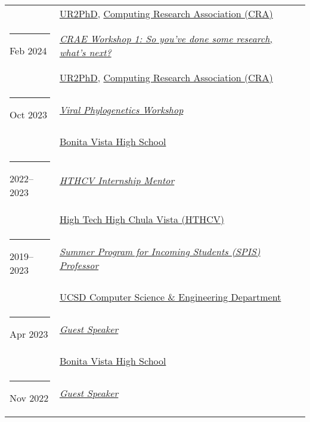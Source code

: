 \documentclass[margin,line]{res}
\begin{document}
\begin{resume}
\begin{longtable}{@{}p{0.7in}p{4in}}
\hspace*{-4mm} & \hspace{4mm} \href{https://cra.org/ur2phd}{UR2PhD}, \href{https://cra.org/}{Computing Research Association (CRA)}\\
\hspace*{-4mm} \rule{-1mm}{5mm} Feb 2024 & \href{https://cra.org/ur2phd/#undergraduate-students}{\textit{CRAE Workshop 1: So you've done some research, what's next?}}\\*
\hspace*{-4mm} & \hspace{4mm} \href{https://cra.org/ur2phd}{UR2PhD}, \href{https://cra.org/}{Computing Research Association (CRA)}\\
\hspace*{-4mm} \rule{-1mm}{5mm} Oct 2023 & \href{https://bvh.sweetwaterschools.org/}{\textit{Viral Phylogenetics Workshop}}\\*
\hspace*{-4mm} & \hspace{4mm} \href{https://bvh.sweetwaterschools.org/}{Bonita Vista High School}\\
\hspace*{-4mm} \rule{-1mm}{5mm} 2022--2023 & \href{http://web.hightechhigh.org/internships/}{\textit{HTHCV Internship Mentor}}\\*
\hspace*{-4mm} & \hspace{4mm} \href{https://www.hightechhigh.org/hthcv/}{High Tech High Chula Vista (HTHCV)}\\
\hspace*{-4mm} \rule{-1mm}{5mm} 2019--2023 & \href{https://sites.google.com/a/eng.ucsd.edu/spis}{\textit{Summer Program for Incoming Students (SPIS) Professor}}\\*
\hspace*{-4mm} & \hspace{4mm} \href{http://cse.ucsd.edu}{UCSD Computer Science \& Engineering Department}\\
\hspace*{-4mm} \rule{-1mm}{5mm} Apr 2023 & \href{https://bvh.sweetwaterschools.org/}{\textit{Guest Speaker}}\\*
\hspace*{-4mm} & \hspace{4mm} \href{https://bvh.sweetwaterschools.org/}{Bonita Vista High School}\\
\hspace*{-4mm} \rule{-1mm}{5mm} Nov 2022 & \href{https://uchs.sandiegounified.org/}{\textit{Guest Speaker}}\\*

\end{longtable}
\end{resume}
\end{document}
